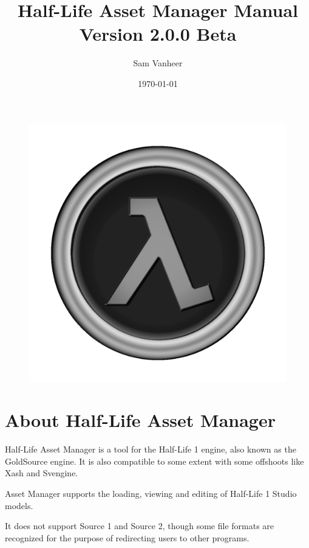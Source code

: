 \documentclass[10pt, a4paper, titlepage, oneside]{article}
\begin{document}
\title{Half-Life Asset Manager Manual\\
\large Version 2.0.0 Beta}
\author{Sam Vanheer}
\date{\today}

\begin{figure}
  \includegraphics[width=\linewidth]{../../assets/hlam_icon2_grayscale.png}
\end{figure}
\maketitle

\tableofcontents

\newpage

\section{About Half-Life Asset Manager}
Half-Life Asset Manager is a tool for the Half-Life 1 engine, also known as the GoldSource engine. It is also compatible to some extent with some offshoots like Xash and Svengine.

Asset Manager supports the loading, viewing and editing of Half-Life 1 Studio models.

It does not support Source 1 and Source 2, though some file formats are recognized for the purpose of redirecting users to other programs.
\end{document}
